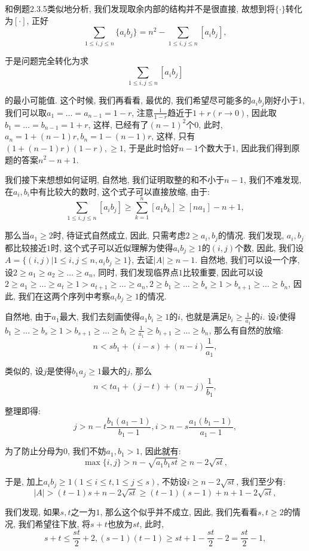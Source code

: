 \documentclass[lang=cn,12pt,thmcnt=section]{elegantbook}
\begin{document}
\begin{analysis}
和例题2.3.5类似地分析, 我们发现取余内部的结构并不是很直接, 故想到将$\{\cdot{}\}$转化为$[\cdot{}]$, 正好
\[
\sum_{1\le i,j\le n}\{a_ib_j\}=n^2-\sum_{1\le i,j\le n}[a_ib_j],
\]

于是问题完全转化为求
\[
\sum_{1\le i,j\le n}[a_ib_j]
\]

的最小可能值. 这个时候, 我们再看看, 最优的, 我们希望尽可能多的$a_ib_j$刚好小于$1$, 我们可以取$a_1=\dots{}=a_{n-1}=1-r$, 注意$\frac{1}{1-r}$趋近于$1+r(r\to 0)$, 因此取$b_1=\dots{}=b_{n-1}=1+r$, 这样, 已经有了$(n-1)^2$个$0$, 此时, $a_n=1+(n-1)r,b_n=1-(n-1)r$, 这样, 只有$(1+(n-1)r)(1-r),\ge 1$, 于是此时恰好$n-1$个数大于$1$, 因此我们得到原题的答案$n^2-n+1$. 

我们接下来想想如何证明, 自然地, 我们证明取整的和不小于$n-1$, 我们不难发现, 在$a_i,b_i$中有比较大的数时, 这个式子可以直接放缩, 由于: 
\[
\sum_{1\le i,j\le n}[a_ib_j]\ge \sum_{k=1}^n [a_1b_k]\ge [na_1]-n+1,
\]

那么当$a_1\ge 2$时, 待证式自然成立, 因此, 只需考虑$2\ge a_i,b_j$的情况. 我们发现, $a_i,b_j$都比较接近$1$时, 这个式子可以近似理解为使得$a_ib_j\ge 1$的$(i,j)$个数, 因此, 我们设$A=\{(i,j)|1\le i,j\le n,a_ib_j\ge 1\}$, 去证$|A|\ge n-1$. 自然地, 我们可以设一个序, 设$2\ge a_1\ge a_2\ge \dots{}\ge a_n$, 同时, 我们发现临界点$1$比较重要, 因此可以设$2\ge a_1\ge \dots{}\ge a_t\ge 1>a_{t+1}\ge \dots{}\ge a_n,2\ge b_1\ge \dots{}\ge b_s\ge 1>b_{s+1}\ge \dots{}\ge b_n$, 因此, 我们在这两个序列中考察$a_ib_j\ge 1$的情况.

自然地, 由于$a_1$最大, 我们去刻画使得$a_1b_i\ge 1$的$i$, 也就是满足$b_i\ge \frac{1}{a_1}$的$i$. 设$i$使得$b_1\ge \dots{}\ge b_s\ge 1>b_{s+1}\ge \dots{}\ge b_i\ge \frac{1}{a_1}\ge b_{i+1}\ge \dots{}\ge b_n$, 那么有自然的放缩:
\[
n< sb_1+(i-s)+(n-i)\frac{1}{a_1},
\]

类似的, 设$j$是使得$b_1a_j\ge 1$最大的$j$, 那么
\[
n< ta_1+(j-t)+(n-j)\frac{1}{b_1},
\]

整理即得:
\[
j> n-t\frac{b_1(a_1-1)}{b_1-1},i> n-s\frac{a_1(b_1-1)}{a_1-1},
\]

为了防止分母为$0$, 我们不妨$a_1,b_1> 1$, 因此就有: 
\[
\max\{i,j\}> n-\sqrt{a_1b_1st}\ge n-2\sqrt{st},
\]

于是, 加上$a_ib_j\ge 1(1\le i\le t,1\le j\le s)$, 不妨设$i\ge n-2\sqrt{st}$, 我们至少有: 
\[
|A|> (t-1)s+n-2\sqrt{st}\ge (t-1)(s-1)+n+1-2\sqrt{st},
\]

我们发现, 如果$s,t$之一为$1$, 那么这个似乎并不成立, 因此, 我们先看看$s,t\ge 2$的情况, 我们希望往下放, 将$s+t$也放为$st$, 此时, 
\[
s+t\le \frac{st}{2}+2,(s-1)(t-1)\ge st+1-\frac{st}{2}-2=\frac{st}{2}-1,
\]


\end{analysis}
\end{document}
